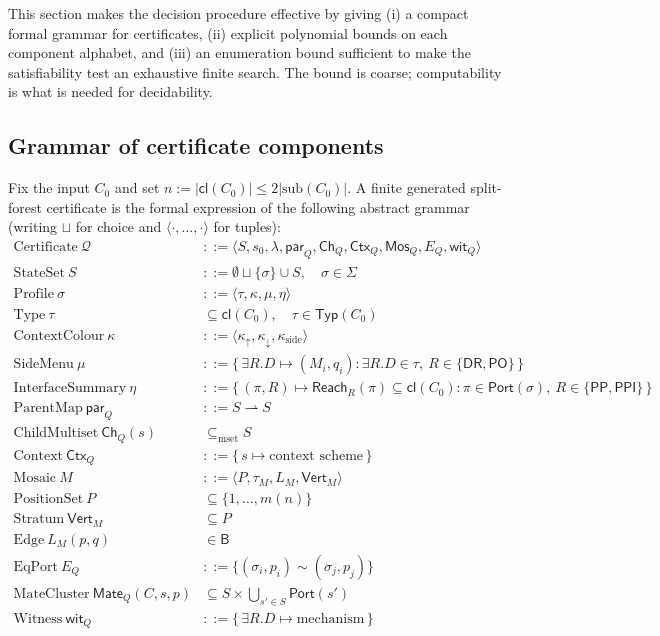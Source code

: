 \documentclass[11pt]{article}
\newcommand{\Base}{\mathsf{B}}
\newcommand{\DR}{\mathsf{DR}}
\newcommand{\PO}{\mathsf{PO}}
\newcommand{\PP}{\mathsf{PP}}
\newcommand{\PPI}{\mathsf{PPI}}
\newcommand{\Cl}{\mathsf{cl}}
\newcommand{\Typ}{\mathsf{Typ}}
\newcommand{\Q}{\mathcal Q}
\newcommand{\Mos}{\mathsf{Mos}}
\newcommand{\Ctx}{\mathsf{Ctx}}
\newcommand{\parr}{\mathsf{par}}
\newcommand{\Port}{\mathsf{Port}}
\newcommand{\Mate}{\mathsf{Mate}}
\newcommand{\Reach}{\mathrel{\mathsf{Reach}}}
\newcommand{\Vrt}{\mathsf{Vert}}
\begin{document}
This section makes the decision procedure effective by giving (i) a
compact formal grammar for certificates, (ii) explicit polynomial
bounds on each component alphabet, and (iii) an enumeration bound
sufficient to make the satisfiability test an exhaustive finite
search.  The bound is coarse; computability is what is needed for
decidability.

\subsection{Grammar of certificate components}
\label{ssec:grammar}

Fix the input $C_0$ and set $n:=|\Cl(C_0)|\le 2|\mathrm{sub}(C_0)|$.
A finite generated split-forest certificate is the formal expression
of the following abstract grammar (writing $\sqcup$ for choice and
$\langle\cdot,\dots,\cdot\rangle$ for tuples):
\begin{align*}
  \text{Certificate}\ \Q
    &::= \langle S, s_0, \lambda, \parr_Q, \mathsf{Ch}_Q, \Ctx_Q,
            \Mos_Q, E_Q, \mathsf{wit}_Q \rangle \\
  \text{StateSet}\ S
    &::= \emptyset \sqcup \{\sigma\}\cup S,\quad \sigma\in\Sigma \\
  \text{Profile}\ \sigma
    &::= \langle \tau, \kappa, \mu, \eta \rangle \\
  \text{Type}\ \tau
    &\subseteq \Cl(C_0),\quad \tau\in\Typ(C_0) \\
  \text{ContextColour}\ \kappa
    &::= \langle \kappa_\uparrow,\kappa_\downarrow,
              \kappa_{\mathrm{side}}\rangle \\
  \text{SideMenu}\ \mu
    &::= \{\,\exists R.D\mapsto(M_i,q_i):
              \exists R.D\in\tau,\ R\in\{\DR,\PO\}\,\} \\
  \text{InterfaceSummary}\ \eta
    &::= \{\,(\pi,R)\mapsto \Reach_R(\pi)\subseteq\Cl(C_0):
              \pi\in\Port(\sigma),\ R\in\{\PP,\PPI\}\,\} \\
  \text{ParentMap}\ \parr_Q
    &::= S\rightharpoonup S \\
  \text{ChildMultiset}\ \mathsf{Ch}_Q(s)
    &\subseteq_{\mathrm{mset}} S \\
  \text{Context}\ \Ctx_Q
    &::= \{\,s\mapsto\text{context scheme}\,\} \\
  \text{Mosaic}\ M
    &::= \langle P,\tau_M, L_M, \Vrt_M\rangle \\
  \text{PositionSet}\ P
    &\subseteq \{1,\dots,m(n)\} \\
  \text{Stratum}\ \Vrt_M
    &\subseteq P \\
  \text{Edge}\ L_M(p,q)
    &\in \Base \\
  \text{EqPort}\ E_Q
    &::= \{(\sigma_i,p_i)\sim(\sigma_j,p_j)\} \\
  \text{MateCluster}\ \Mate_Q(C,s,p)
    &\subseteq S\times\bigcup_{s'\in S}\Port(s') \\
  \text{Witness}\ \mathsf{wit}_Q
    &::= \{\,\exists R.D\mapsto\text{mechanism}\,\}
\end{align*}
\end{document}
